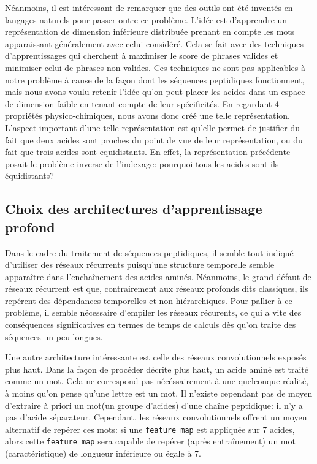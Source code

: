 \documentclass[a4paper, journal, 11pt, onecolumn]{IEEEtran}
\begin{document}
Néanmoins, il est intéressant de remarquer que des outils ont été inventés en
langages naturels pour passer outre ce problème. L'idée est d'apprendre un
représentation de dimension inférieure distribuée prenant en compte les mots
apparaissant généralement avec celui considéré. Cela se fait avec des techniques
d'apprentissages qui cherchent à maximiser le score de phrases valides et
minimiser celui de phrases non valides. Ces techniques ne sont pas applicables à
notre problème à cause de la façon dont les séquences peptidiques fonctionnent,
mais nous avons voulu retenir l'idée qu'on peut placer les acides dans un espace
de dimension faible en tenant compte de leur spécificités. En regardant 4
propriétés physico-chimiques, nous avons donc créé une telle représentation.
L'aspect important d'une telle représentation est qu'elle permet de justifier du
fait que deux acides sont proches du point de vue de leur représentation, ou du
fait que trois acides sont equidistants. En effet, la représentation précédente
posait le problème inverse de l'indexage: pourquoi tous les acides sont-ils équidistants?

\subsection{Choix des architectures d'apprentissage profond}

Dans le cadre du traitement de séquences peptidiques, il semble tout indiqué
d'utiliser des réseaux récurrents puisqu'une structure temporelle semble
apparaître dans l'enchaînement des acides aminés. Néanmoins, le grand défaut de
réseaux récurrent est que, contrairement aux réseaux profonds dits \og
classiques\fg, ils repérent des dépendances temporelles et non hiérarchiques.
Pour pallier à ce problème, il semble nécessaire d'empiler les réseaux
récurents, ce qui a vite des conséquences significatives en termes de temps de
calculs dès qu'on traite des séquences un peu longues.

Une autre architecture intéressante est celle des réseaux convolutionnels
exposés plus haut. Dans la façon de procéder décrite plus haut, un acide aminé
est traité comme un \og mot\fg. Cela ne correspond pas nécéssairement à une
quelconque réalité, à moins qu'on pense qu'une lettre est un mot. Il n'existe
cependant pas de moyen d'extraire à priori un \og mot\fg (un groupe d'acides)
d'une chaîne peptidique: il n'y a pas d'acide \og séparateur\fg. Cependant, les
réseaux convolutionnels offrent un moyen alternatif de repérer ces mots: si une
\texttt{feature map} est appliquée sur 7 acides, alors cette \texttt{feature
  map} sera capable de repérer (après entraînement) un mot (caractéristique) de
longueur inférieure ou égale à 7.
\end{document}
